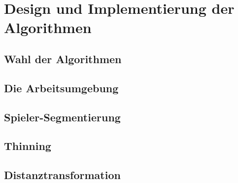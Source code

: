 \chapter{Design und Implementierung der Algorithmen}
\section{Wahl der Algorithmen}
\section{Die Arbeitsumgebung}
\section{Spieler-Segmentierung}
\section{Thinning}  %
\section{Distanztransformation}
